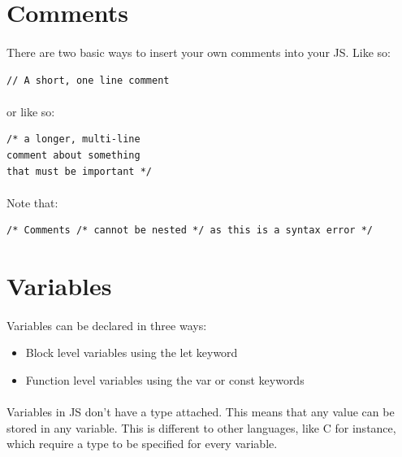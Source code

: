 \section{Comments}

\paragraph{} There are two basic ways to insert your own comments into your JS. Like so:

\begin{lstlisting}
// A short, one line comment
\end{lstlisting}

\paragraph{} or like so:

\begin{lstlisting}
/* a longer, multi-line 
comment about something 
that must be important */
\end{lstlisting}

\paragraph{} Note that:

\begin{lstlisting}
/* Comments /* cannot be nested */ as this is a syntax error */
\end{lstlisting}


\section{Variables}
\paragraph{} Variables can be declared in three ways:

\begin{itemize}
\item Block level variables using the let keyword
\item Function level variables using the var or const keywords
\end{itemize}

\paragraph{} Variables in JS don’t have a type attached. This means that any value can be stored in any variable. This is different to other languages, like C for instance, which require a type to be specified for every variable.

